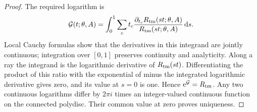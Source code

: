 \begin{proof}
The required logarithm is
\begin{equation}\label{eq:interacting-logarithm}
 \mathcal G(t;\theta,A)=
 \int_0^1\sum_ct_c
       \frac{\partial_{t_c}R_{\rm tm}(st;\theta,A)}
            {R_{\rm tm}(st;\theta,A)}\,\mathrm d s .
\end{equation}
Local Cauchy formulas show that the derivatives
in this integrand are jointly continuous;
integration over $[0,1]$ preserves continuity
and analyticity. Along a ray the integrand is
the logarithmic derivative of $R_{\rm tm}(st)$.
Differentiating the product of this ratio with
the exponential of minus the integrated
logarithmic derivative gives zero, and its
value at $s=0$ is one. Hence
$\mathrm e^{\mathcal G}=R_{\rm tm}$.
Any two continuous logarithms differ by
$2\pi i$ times an integer-valued continuous
function on the connected polydisc. Their
common value at zero proves uniqueness.
\end{proof}


